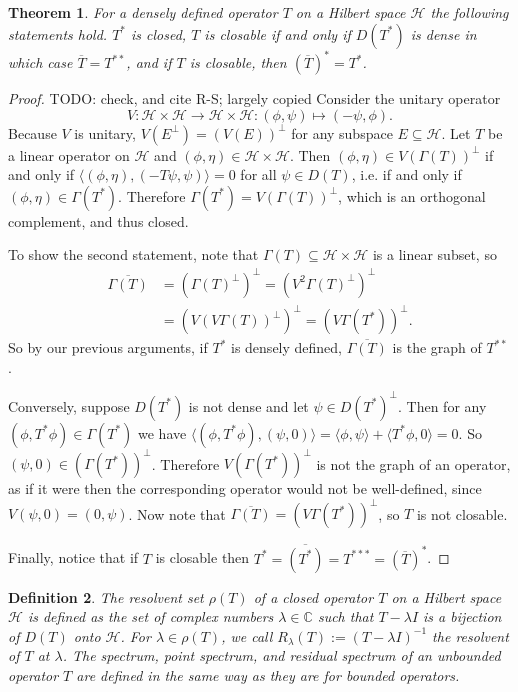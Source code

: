 \documentclass[12pt,oneside]{report}
\newtheorem{thm}{Theorem}[chapter]
\newtheorem{defn}[thm]{Definition}
\begin{document}
\begin{thm}
    For a densely defined operator $T$ on a Hilbert space $\mathscr{H}$ the following statements hold. $T^{*}$ is closed, $T$ is closable if and only if $D(T^{*})$ is dense in which case $\overline{T} = T^{**}$, and if $T$ is closable, then $(\overline{T})^{*} = T^{*}$.
\end{thm}
\begin{proof}
    TODO: check, and cite R-S; largely copied Consider the unitary operator $$V: \mathscr{H} \times \mathscr{H} \to \mathscr{H} \times \mathscr{H}: (\phi,\psi) \mapsto (-\psi,\phi).$$Because $V$ is unitary, $V(E^{\perp}) = (V(E))^{\perp}$ for any subspace $E \subseteq \mathscr{H}$. Let $T$ be a linear operator on $\mathscr{H}$ and $(\phi, \eta) \in \mathscr{H} \times \mathscr{H}$. Then $(\phi, \eta) \in V(\Gamma(T))^{\perp}$ if and only if $\langle (\phi,\eta), (-T\psi,\psi) \rangle = 0$ for all $\psi \in D(T)$, i.e. if and only if $(\phi, \eta) \in \Gamma(T^{*})$. Therefore $\Gamma(T^{*}) = V(\Gamma(T))^{\perp}$, which is an orthogonal complement, and thus closed.

    To show the second statement, note that $\Gamma(T) \subseteq \mathscr{H} \times \mathscr{H}$ is a linear subset, so
    \begin{align*}
        \overline{\Gamma(T)} &= (\Gamma(T)^{\perp})^{\perp} = (V^{2}\Gamma(T)^{\perp})^{\perp} \\
        &= (V(V\Gamma(T))^{\perp})^{\perp} = (V\Gamma(T^{*}))^{\perp}.
    \end{align*}
    So by our previous arguments, if $T^{*}$ is densely defined, $\overline{\Gamma(T)}$ is the graph of $T^{**}$.

    Conversely, suppose $D(T^{*})$ is not dense and let $\psi \in D(T^{*})^{\perp}$. 
    Then for any $(\phi, T^{*}\phi) \in \Gamma(T^{*})$ we have $\langle (\phi, T^{*}\phi), (\psi,0) \rangle = \langle \phi, \psi \rangle + \langle T^{*}\phi, 0 \rangle = 0$. So $(\psi, 0) \in (\Gamma(T^{*}))^{\perp}$.
    Therefore $V(\Gamma(T^{*}))^{\perp}$ is not the graph of an operator, as if it were then the corresponding operator would not be well-defined, since $V(\psi, 0) = (0, \psi)$. Now note that $\overline{\Gamma(T)} = (V\Gamma(T^{*}))^{\perp}$, so $T$ is not closable.

    Finally, notice that if $T$ is closable then $T^{*} = \overline{(T^{*})} = T^{***} = (\overline{T})^{*}$.
\end{proof}

\begin{defn}
    The resolvent set $\rho(T)$ of a closed operator $T$ on a Hilbert space $\mathscr{H}$ is defined as the set of complex numbers $\lambda \in \mathbb{C}$ such that $T - \lambda I$ is a bijection of $D(T)$ onto $\mathscr{H}$. For $\lambda \in \rho(T)$, we call $R_\lambda (T) := (T - \lambda I)^{-1}$ the resolvent of $T$ at $\lambda$. The spectrum, point spectrum, and residual spectrum of an unbounded operator $T$ are defined in the same way as they are for bounded operators.
\end{defn}
\end{document}
